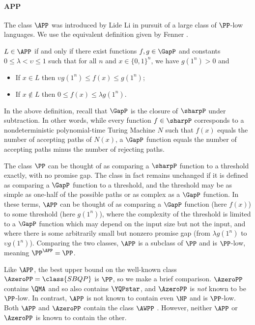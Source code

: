 \paragraph{\texorpdfstring{$\mathsf{\mathbf{APP}}$}{APP}}
The class $\APP$ was introduced by
Lide %
%
Li \cite{li1993counting} in pursuit of
a large class of $\PP$-low languages.
We use the equivalent definition given by Fenner \cite[Corollary 3.7]{fenner2003pp}.

\begin{definition}\label{def:APP}
	$L\in \APP$ if and only if there exist
	functions $f,g\in \GapP$ and constants $0\leq \lambda < \upsilon \leq 1$ such that
	for all $n$ and $x\in\{0,1\}^n$,
	we have $g(1^n)>0$ and
	\begin{itemize}
		\item If $x\in L$ then
		$\upsilon g(1^n) \leq f(x) \leq g(1^n)$;
		\item If $x\notin L$ then $0\leq f(x) \leq \lambda g(1^n)$.
	\end{itemize}
\end{definition}

In the above definition, recall that $\GapP$ is the closure of $\sharpP$ under
subtraction.
In other words, while every function $f\in \sharpP$ corresponds to a nondeterministic
polynomial-time Turing Machine $N$ such that $f(x)$ equals the number of accepting paths
of $N(x)$,
a $\GapP$ function equals the number of accepting paths minus the number
of rejecting paths.

The class $\PP$ can be thought of as comparing a $\sharpP$ function
to a threshold exactly, with no promise gap.
The class in fact remains unchanged if it is defined as comparing a $\GapP$ function
to a threshold, and the threshold may be as simple as one-half of the possible paths or as complex as a
$\GapP$ function.
In these terms,
$\APP$ can be thought of as comparing a $\GapP$ function (here $f(x)$) to some threshold
(here $g(1^n)$),
where the complexity of the threshold is limited to a $\GapP$ function which may
depend on the input size but not the input,
and where there is some arbitrarily small but nonzero promise gap
(from $\lambda g(1^n)$ to $\upsilon g(1^n)$).
Comparing the two classes,
$\APP$ is a subclass of $\PP$ and is $\PP$-low, meaning $\PP^\APP = \PP$.

%
%
%
%
%
Like $\APP$, 
the best upper bound on the
well-known class $\AzeroPP=\class{SBQP}$ \cite{kuperberg2015hard}
is $\PP$,
so we make a brief comparison.
%
$\AzeroPP$ contains $\QMA$ \cite{vyalyi03}
and so also contains $\YQPstar$,
and $\AzeroPP$ is \emph{not} known to be $\PP$-low.
In contrast, $\APP$ is not known to contain even $\NP$ and is $\PP$-low.
Both $\APP$ and $\AzeroPP$ contain the class $\AWPP$ \cite{fenner2003pp,vyalyi03}.
However,
neither $\APP$ or $\AzeroPP$ is known to contain the other.

